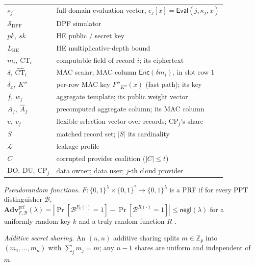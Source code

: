 \documentclass[a4paper,fleqn]{cas-sc}
\newcommand{\negl}{\mathsf{negl}}
\newcommand{\PPT}{\mathrm{PPT}}
\newcommand{\Leak}{\mathcal{L}}
\newcommand{\Sim}{\mathcal{S}}
\newcommand{\Eval}{\mathsf{Eval}}
\newcommand{\Enc}{\mathsf{Enc}}
\newcommand{\advPRF}{\mathbf{Adv}^{\mathrm{prf}}}
\begin{document}
\begin{table}[pos=htbp]
\begin{tabular}{@{}l>{\raggedright\arraybackslash}p{5.5cm}@{}}
$e_j$ & full-domain evaluation vector, $e_j[x]=\Eval(j,\kappa_j,x)$ \\
$\Sim_{\mathrm{DPF}}$ & DPF simulator \\
$pk,\ sk$ & HE public / secret key \\
$L_{\mathrm{HE}}$ & HE multiplicative-depth bound \\
$m_i,\ \text{CT}_i$ & computable field of record $i$; its ciphertext \\
$\delta,\ \widehat{\text{CT}}_i$ & MAC scalar; MAC column $\Enc(\delta m_i)$,
in slot row 1 \\
$\delta_x,\ K''$ & per-row MAC key $F''_{K''}(x)$ (fast path); its key \\
$f,\ w_f$ & aggregate template; its public weight vector \\
$A_f,\ \widehat{A}_f$ & precomputed aggregate column; its MAC column \\
$v,\ v_j$ & flexible selection vector over records; $\text{CP}_j$'s share \\
$S$ & matched record set; $|S|$ its cardinality \\
$\Leak$ & leakage profile \\
$C$ & corrupted provider coalition ($|C|\le t$) \\
$\mathrm{DO,\ DU},\ \text{CP}_j$ & data owner; data user; $j$-th cloud
provider \\
\bottomrule
\end{tabular}
\end{table}

\emph{Pseudorandom functions.} $F:\{0,1\}^\lambda\times\{0,1\}^*\!\to\!
\{0,1\}^\lambda$ is a PRF if for every $\PPT$ distinguisher $\mathcal{B}$,
$\advPRF_{F,\mathcal{B}}(\lambda)=|\Pr[\mathcal{B}^{F_k(\cdot)}=1]-
\Pr[\mathcal{B}^{R(\cdot)}=1]|\le\negl(\lambda)$ for a uniformly random key
$k$ and a truly random function $R$ \citep{goldreich2019construct}.

\emph{Additive secret sharing.} An $(n,n)$ additive sharing splits
$m\in\mathbb{Z}_p$ into $(m_1,\dots,m_n)$ with $\sum_j m_j=m$; any $n-1$
shares are uniform and independent of $m$.
\end{document}
